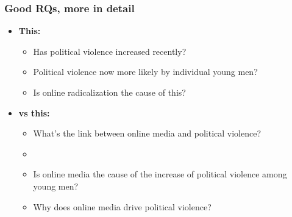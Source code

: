 \begin{frame}
\frametitle{Good RQs, more in detail}
\centering

\begin{itemize}
  \item[] \textbf{This:}
  \begin{itemize}
    \item Has political violence increased recently?
    \item Political violence now more likely by individual young men?
    \item Is online radicalization the cause of this?
  \end{itemize}
  \item[] \textbf{vs this:}
  \begin{itemize}
    \item What's the link between online media and political violence?
    \item[] {\color{asher}{\small (too broad)}}
    \item Is online media the cause of the increase of political violence among young men? {\color{asher}{\small (many questions in one)}}
    \item Why does online media drive political violence? {\color{asher}{\small (??)}}
  \end{itemize}
\end{itemize}

\end{frame}

